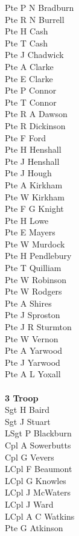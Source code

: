 \begin{multicols}{3}
  Pte P N Bradburn \\
  Pte R N Burrell \\
  Pte H Cash \\
  Pte T Cash \\
  Pte J Chadwick \\
  Pte A Clarke \\
  Pte E Clarke \\
  Pte P Connor \\
  Pte T Connor \\
  Pte R A Dawson \\
  Pte R Dickinson \\
  Pte F Ford \\
  Pte H Henshall \\
  Pte J Henshall \\
  Pte J Hough \\
  Pte A Kirkham \\
  Pte W Kirkham \\
  Pte F G Knight \\
  Pte H Lowe \\
  Pte E Mayers \\
  Pte W Murdock \\
  Pte H Pendlebury \\
  Pte T Quilliam \\
  Pte W Robinson \\
  Pte W Rodgers \\
  Pte A Shires \\
  Pte J Sproston \\
  Pte J R Sturmton \\
  Pte W Vernon \\
  Pte A Yarwood \\
  Pte J Yarwood \\
  Pte A L Yoxall \\
  \\
  \textbf{3 Troop} \\
  Sgt H Baird \\
  Sgt J Stuart \\
  LSgt P Blackburn \\
  Cpl A Sowerbutts \\
  Cpl G Vevers \\
  LCpl F Beaumont \\
  LCpl G Knowles \\
  LCpl J McWaters \\
  LCpl J Ward \\
  LCpl A C Watkins \\
  Pte G Atkinson \\

\end{multicols}
